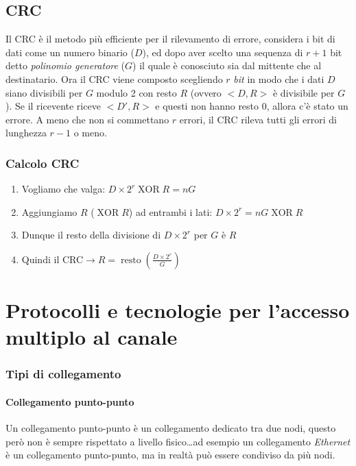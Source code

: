     \subsection[\textit{Cyclic Redundancy Check} (\texttt{CRC})]{\acrfull*{CRC}}
        Il \Acrshort*{CRC} è il metodo più efficiente per il rilevamento di errore, considera i bit di dati come un numero binario ($D$), ed dopo aver scelto una sequenza di $r+1$ bit detto \textit{polinomio generatore} ($G$) il quale è conosciuto sia dal mittente che al destinatario. Ora il \Acrshort*{CRC} viene composto scegliendo $r$ \textit{bit} in modo che i dati $D$ siano divisibili per $G$ modulo 2 con resto $R$ (ovvero $<D,R>$ è divisibile per $G$). Se il ricevente riceve $<D',R>$ e questi non hanno resto 0, allora c'è stato un errore. A meno che non si commettano $r$ errori, il \Acrshort*{CRC} rileva tutti gli errori di lunghezza $r-1$ o meno.
        \subsubsection{Calcolo \Acrshort*{CRC}}
            \begin{enumerate}
                \item Vogliamo che valga: $D\times 2^r \operatorname{XOR} R = nG$
                \item Aggiungiamo $R$ ($\operatorname{XOR} R$) ad entrambi i lati: $D\times 2^r = nG \operatorname{XOR} R$
                \item Dunque il resto della divisione di $D\times 2^r$ per $G$ è $R$
                \item Quindi il \Acrshort*{CRC}$\rightarrow R=\operatorname{resto}\left(\frac{D\times 2^r}G\right)$
            \end{enumerate}
\section[Protocolli Accesso Multiplo Canale]{Protocolli e tecnologie per l'accesso multiplo al canale}
    \subsubsection{Tipi di collegamento}
        \paragraph{Collegamento punto-punto} Un collegamento punto-punto è un collegamento dedicato tra due nodi, questo però non è sempre rispettato a livello fisico\dots ad esempio un collegamento \textit{Ethernet} è un collegamento punto-punto, ma in realtà può essere condiviso da più nodi.
